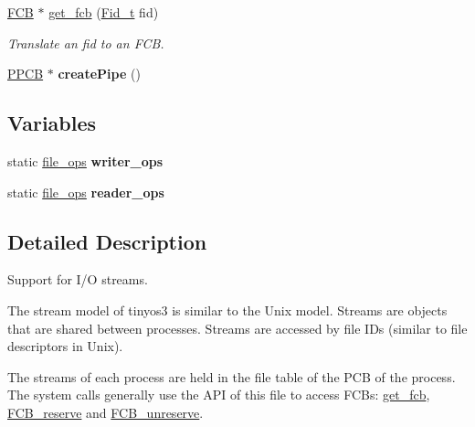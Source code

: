 \begin{DoxyCompactItemize}
\hyperlink{group__streams_ga0c7e751afb9d6cadebf070961804d400}{F\+CB} $\ast$ \hyperlink{group__streams_ga36b4f172aba29ba2660d0aed0f10d60b}{get\+\_\+fcb} (\hyperlink{group__syscalls_ga5097222c5f0da97d92d4712359abc38f}{Fid\+\_\+t} fid)
\begin{DoxyCompactList}\small\item\em Translate an fid to an F\+CB. \end{DoxyCompactList}\item 
\hyperlink{structpipe__control__block}{P\+P\+CB} $\ast$ {\bfseries create\+Pipe} ()\hypertarget{group__streams_gaeb8bcbe817a708b9309d4b99cd1a3418}{}\label{group__streams_gaeb8bcbe817a708b9309d4b99cd1a3418}

\end{DoxyCompactItemize}
\subsection*{Variables}
\begin{DoxyCompactItemize}
\item 
static \hyperlink{group__dev_gaab625d8ae3a95e942ed10ed1579f5042}{file\+\_\+ops} {\bfseries writer\+\_\+ops}\hypertarget{group__streams_ga8c36c85c17864c5e57ca7b0274023328}{}\label{group__streams_ga8c36c85c17864c5e57ca7b0274023328}

\item 
static \hyperlink{group__dev_gaab625d8ae3a95e942ed10ed1579f5042}{file\+\_\+ops} {\bfseries reader\+\_\+ops}\hypertarget{group__streams_gadf9305b9f8fb5b134942f575c6a42acc}{}\label{group__streams_gadf9305b9f8fb5b134942f575c6a42acc}

\end{DoxyCompactItemize}


\subsection{Detailed Description}
Support for I/O streams. 

The stream model of tinyos3 is similar to the Unix model. Streams are objects that are shared between processes. Streams are accessed by file I\+Ds (similar to file descriptors in Unix).

The streams of each process are held in the file table of the P\+CB of the process. The system calls generally use the A\+PI of this file to access F\+C\+Bs\+: \hyperlink{group__streams_ga36b4f172aba29ba2660d0aed0f10d60b}{get\+\_\+fcb}, \hyperlink{group__streams_ga462269376de145171b87b7bc3036e4f8}{F\+C\+B\+\_\+reserve} and \hyperlink{group__streams_gac44c094845a8d4e2e13f9df5b17274df}{F\+C\+B\+\_\+unreserve}.

